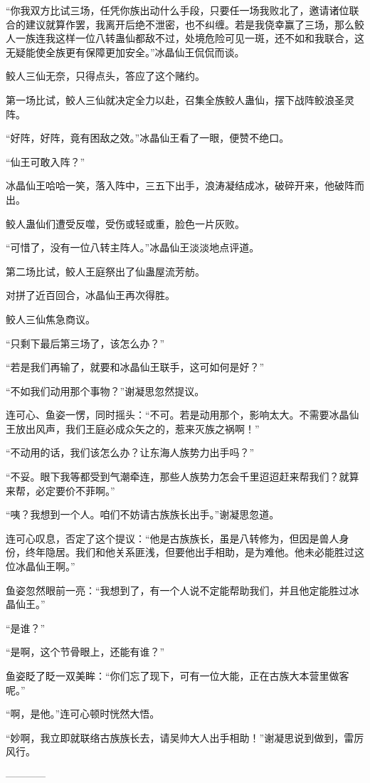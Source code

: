 \begin{this_body}
“你我双方比试三场，任凭你族出动什么手段，只要任一场我败北了，邀请诸位联合的建议就算作罢，我离开后绝不泄密，也不纠缠。若是我侥幸赢了三场，那么鲛人一族连我这样一位八转蛊仙都敌不过，处境危险可见一斑，还不如和我联合，这无疑能使全族更有保障更加安全。”冰晶仙王侃侃而谈。

鲛人三仙无奈，只得点头，答应了这个赌约。

第一场比试，鲛人三仙就决定全力以赴，召集全族鲛人蛊仙，摆下战阵鲛浪圣灵阵。

“好阵，好阵，竟有困敌之效。”冰晶仙王看了一眼，便赞不绝口。

“仙王可敢入阵？”

冰晶仙王哈哈一笑，落入阵中，三五下出手，浪涛凝结成冰，破碎开来，他破阵而出。

鲛人蛊仙们遭受反噬，受伤或轻或重，脸色一片灰败。

“可惜了，没有一位八转主阵人。”冰晶仙王淡淡地点评道。

第二场比试，鲛人王庭祭出了仙蛊屋流芳舫。

对拼了近百回合，冰晶仙王再次得胜。

鲛人三仙焦急商议。

“只剩下最后第三场了，该怎么办？”

“若是我们再输了，就要和冰晶仙王联手，这可如何是好？”

“不如我们动用那个事物？”谢凝思忽然提议。

连可心、鱼姿一愣，同时摇头：“不可。若是动用那个，影响太大。不需要冰晶仙王放出风声，我们王庭必成众矢之的，惹来灭族之祸啊！”

“不动用的话，我们该怎么办？让东海人族势力出手吗？”

“不妥。眼下我等都受到气潮牵连，那些人族势力怎会千里迢迢赶来帮我们？就算来帮，必定要价不菲啊。”

“咦？我想到一个人。咱们不妨请古族族长出手。”谢凝思忽道。

连可心叹息，否定了这个提议：“他是古族族长，虽是八转修为，但因是兽人身份，终年隐居。我们和他关系匪浅，但要他出手相助，是为难他。他未必能胜过这位冰晶仙王啊。”

鱼姿忽然眼前一亮：“我想到了，有一个人说不定能帮助我们，并且他定能胜过冰晶仙王。”

“是谁？”

“是啊，这个节骨眼上，还能有谁？”

鱼姿眨了眨一双美眸：“你们忘了现下，可有一位大能，正在古族大本营里做客呢。”

“啊，是他。”连可心顿时恍然大悟。

“妙啊，我立即就联络古族族长去，请吴帅大人出手相助！”谢凝思说到做到，雷厉风行。

------------

\end{this_body}

